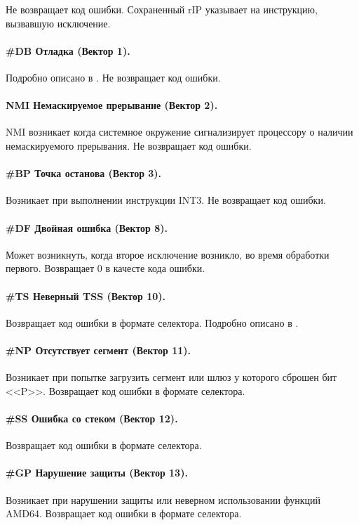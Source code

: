 Не возвращает код ошибки. Сохраненный rIP указывает на инструкцию, вызвавшую
исключение.

\paragraph{\#DB Отладка (Вектор 1).}
Подробно описано в \cite{amd_pm_v2}. Не возвращает код ошибки.

\paragraph{NMI Немаскируемое прерывание (Вектор 2).}
NMI возникает когда системное окружение сигнализирует процессору о наличии
немаскируемого прерывания. Не возвращает код ошибки.

\paragraph{\#BP Точка останова (Вектор 3).}
Возникает при выполнении инструкции INT3. Не возвращает код ошибки.

\paragraph{\#DF Двойная ошибка (Вектор 8).}
Может возникнуть, когда второе исключение возникло, во время обработки
первого. Возвращает 0 в качесте кода ошибки.

\paragraph{\#TS Неверный TSS (Вектор 10).}
Возвращает код ошибки в формате селектора. Подробно описано в \cite[стр. 222]{amd_pm_v2}.

\paragraph{\#NP Отсутствует сегмент (Вектор 11).}
Возникает при попытке загрузить сегмент или шлюз у которого сброшен бит <<P>>.
Возвращает код ошибки в формате селектора.

\paragraph{\#SS Ошибка со стеком (Вектор 12).}
Возвращает код ошибки в формате селектора.

\paragraph{\#GP Нарушение защиты (Вектор 13).}
Возникает при нарушении защиты или неверном использовании функций AMD64.
Возвращает код ошибки в формате селектора.

